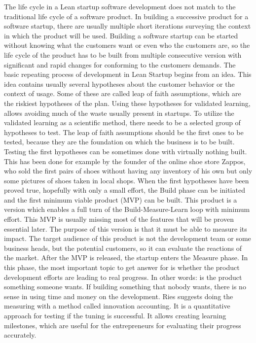  
 The life cycle in a Lean startup software development does not match to the traditional life cycle of a software product. In building a successive product for a software startup, there are usually multiple short iterations surveying the context in which the product will be used. Building a software startup can be started without knowing what the customers want or even who the customers are, so the life cycle of the product has to be built from multiple consecutive version with significant and rapid changes for conforming to the customers demands.
The basic repeating process of development in Lean Startup begins from an idea. This idea contains usually several hypotheses about the customer behavior or the context of usage. Some of these are called leap of faith assumptions, which are the riskiest hypotheses of the plan. Using these hypotheses for validated learning, allows avoiding much of the waste usually present in startups. To utilize the validated learning as a scientific method, there needs to be a selected group of hypotheses to test. The leap of faith assumptions should be the first ones to be tested, because they are the foundation on which the business is to be built. Testing the first hypotheses can be sometimes done with virtually nothing built. This has been done for example by the founder of the online shoe store Zappos, who sold the first pairs of shoes without having any inventory of his own but only some pictures of shoes taken in local shops.
When the first hypotheses have been proved true, hopefully with only a small effort, the Build phase can be initiated and the first minimum viable product (MVP) can be built. This product is a version which enables a full turn of the Build-Measure-Learn loop with minimum effort. This MVP is usually missing most of the features that will be proven essential later. The purpose of this version is that it must be able to measure its impact. The target audience of this product is not the development team or some business heads, but the potential customers, so it can evaluate the reactions of the market.
After the MVP is released, the startup enters the Measure phase. In this phase, the most important topic to get answer for is whether the product development efforts are leading to real progress. In other words: is the product something someone wants. If building something that nobody wants, there is no sense in using time and money on the development. Ries suggests doing the measuring with a method called innovation accounting. It is a quantitative approach for testing if the tuning is successful. It allows creating learning milestones, which are useful for the entrepreneurs for evaluating their progress accurately.
